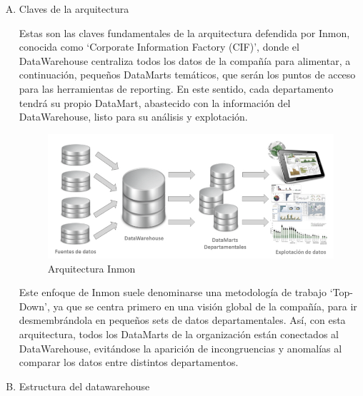 \documentclass[11pt,a4paper]{article}
\begin{document}
		
	
		\begin{enumerate}[A.]
			\item Claves de la arquitectura 
			
			Estas son las claves fundamentales de la arquitectura defendida por Inmon, conocida como ‘Corporate Information Factory (CIF)’, donde el DataWarehouse centraliza todos los datos de la compañía para alimentar, a continuación, pequeños DataMarts temáticos, que serán los puntos de acceso para las herramientas de reporting. En este sentido, cada departamento tendrá su propio DataMart, abastecido con la información del DataWarehouse, listo para su análisis y explotación.
			
			\begin{figure}[!ht]
				\begin{center}
					\includegraphics[scale=2.2]{./Imagenes/img03}	
					\caption{Arquitectura Inmon}		
				\end{center}
			\end{figure}
		
			Este enfoque de Inmon suele denominarse una metodología de trabajo ‘Top-Down’, ya que se centra primero en una visión global de la compañía, para ir desmembrándola en pequeños sets de datos departamentales. Así, con esta arquitectura, todos los DataMarts de la organización están conectados al DataWarehouse, evitándose la aparición de incongruencias y anomalías al comparar los datos entre distintos departamentos.
			
			\item Estructura del datawarehouse
			

\end{enumerate}
\end{document}
